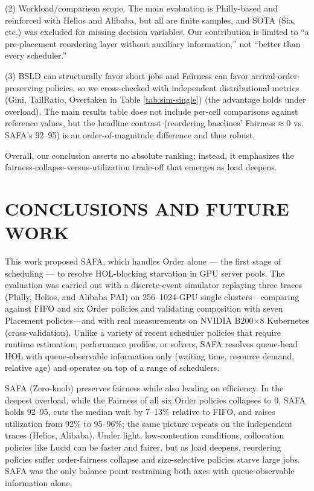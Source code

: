\documentclass{ieeetj}
\begin{document}
(2) Workload/comparison scope. The main evaluation is Philly-based and reinforced with Helios and Alibaba, but all are finite samples, and SOTA (Sia, etc.) was excluded for missing decision variables. Our contribution is limited to ``a pre-placement reordering layer without auxiliary information,'' not ``better than every scheduler.''

(3) BSLD\cite{feitelson1998metrics} can structurally favor short jobs and Fairness can favor arrival-order-preserving policies, so we cross-checked with independent distributional metrics (Gini, TailRatio, Overtaken in Table \ref{tab:sim-single}) (the advantage holds under overload). The main results table does not include per-cell comparisons against reference values, but the headline contrast (reordering baselines' Fairness$\approx$0 vs. SAFA's 92--95) is an order-of-magnitude difference and thus robust.

Overall, our conclusion asserts no absolute ranking; instead, it emphasizes the fairness-collapse-versus-utilization trade-off that emerges as load deepens.

\FloatBarrier

\section{CONCLUSIONS AND FUTURE WORK}\label{conclu}

This work proposed SAFA, which handles Order alone --- the first stage of scheduling --- to resolve HOL-blocking starvation in GPU server pools. The evaluation was carried out with a discrete-event simulator replaying three traces (Philly, Helios, and Alibaba PAI) on 256--1024-GPU single clusters---comparing against FIFO and six Order policies and validating composition with seven Placement policies---and with real measurements on NVIDIA B200$\times$8 Kubernetes (cross-validation). Unlike a variety of recent scheduler policies that require runtime estimation, performance profiles, or solvers, SAFA resolves queue-head HOL with queue-observable information only (waiting time, resource demand, relative age) and operates on top of a range of schedulers.

SAFA (Zero-knob) preserves fairness while also leading on efficiency. In the deepest overload, while the Fairness of all six Order policies collapses to 0, SAFA holds 92--95, cuts the median wait by 7--13\% relative to FIFO, and raises utilization from 92\% to 95--96\%; the same picture repeats on the independent traces (Helios, Alibaba). Under light, low-contention conditions, collocation policies like Lucid can be faster and fairer, but as load deepens, reordering policies suffer order-fairness collapse and size-selective policies starve large jobs. SAFA was the only balance point restraining both axes with queue-observable information alone.
\end{document}
